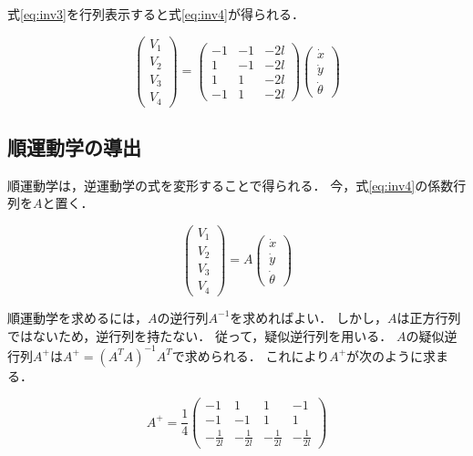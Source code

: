 式\ref{eq:inv3}を行列表示すると式\ref{eq:inv4}が得られる．

\begin{equation}
  \begin{pmatrix}
    V_{1} \\ V_{2} \\ V_{3} \\ V_{4}
  \end{pmatrix}
  =
  \begin{pmatrix}
     -1 & -1 & -2l \\
     1 & -1 & -2l \\
     1 & 1 & -2l \\
     -1 & 1 & -2l
  \end{pmatrix}
  \begin{pmatrix}
    \dot{x} \\
    \dot{y} \\
    \dot{\theta}
  \end{pmatrix}
  \label{eq:inv4}
\end{equation}

\subsection{順運動学の導出}

順運動学は，逆運動学の式を変形することで得られる．
今，式\ref{eq:inv4}の係数行列を$A$と置く．

\begin{equation*}
  \begin{pmatrix}
    V_{1} \\ V_{2} \\ V_{3} \\ V_{4}
  \end{pmatrix}
  =
  A
  \begin{pmatrix}
    \dot{x} \\
    \dot{y} \\
    \dot{\theta}
  \end{pmatrix}
  \label{eq:inv4}
\end{equation*}

順運動学を求めるには，$A$の逆行列$A^{-1}$を求めればよい．
しかし，$A$は正方行列ではないため，逆行列を持たない．
従って，疑似逆行列を用いる．
$A$の疑似逆行列$A^{+}$は$A^{+} = (A^{T}A)^{-1}A^{T}$で求められる．
これにより$A^{+}$が次のように求まる．

\begin{equation}
  A^{+} = \frac{1}{4}
  \begin{pmatrix}
    -1 & 1 & 1 & -1 \\
    -1 & -1 & 1 & 1 \\
    -\frac{1}{2l} & -\frac{1}{2l} & -\frac{1}{2l} & -\frac{1}{2l}
  \end{pmatrix}
\end{equation}


